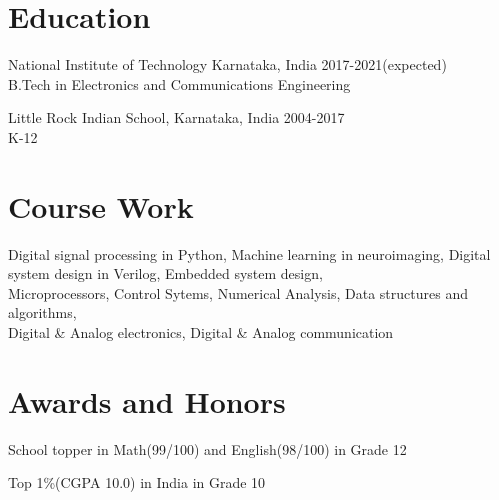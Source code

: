 \documentclass[letterpaper]{article}
\renewenvironment{itemize}{
  \begin{list}{}{
    \setlength{\leftmargin}{1.5em}
  }
}{
  \end{list}
}
\begin{document}
\section*{Education}
  \begin{itemize}
    \item National Institute of Technology Karnataka, India\hfill
    \textcolor{black!80}{\small{2017-2021(expected)}}
    \\
    \textcolor{black!80}{\small{B.Tech in Electronics and Communications Engineering}}

    \item Little Rock Indian School, Karnataka, India\hfill
    \textcolor{black!80}{\small{2004-2017}}
    \\
    \textcolor{black!80}{\small{K-12}}
  \end{itemize}


\section*{Course Work}
  Digital signal processing in Python, Machine learning in neuroimaging, Digital system design in Verilog, Embedded system design, \\
  Microprocessors, Control Sytems, Numerical Analysis, Data structures and algorithms, \\
  Digital \& Analog electronics, Digital \& Analog communication


\section*{Awards and Honors}
\begin{itemize}
  \item School topper in Math(99/100) and English(98/100) in Grade 12
  \item Top 1\%(CGPA 10.0) in India in Grade 10
\end{itemize}


\end{document}
